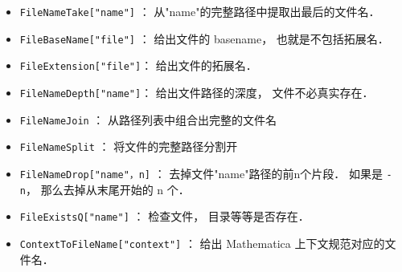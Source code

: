 
\begin{itemize}
\item \verb`FileNameTake["name"]` ： 从"name"的完整路径中提取出最后的文件名．
\item \verb`FileBaseName["file"]` ： 给出文件的 basename， 也就是不包括拓展名．
\item \verb`FileExtension["file"]`： 给出文件的拓展名．
\item \verb`FileNameDepth["name"]`： 给出文件路径的深度， 文件不必真实存在．
\end{itemize}


\begin{itemize}
\item \verb`FileNameJoin` ： 从路径列表中组合出完整的文件名
\item \verb`FileNameSplit` ： 将文件的完整路径分割开
\item \verb`FileNameDrop["name"，n]` ： 去掉文件"name"路径的前n个片段． 如果是 \verb`-n`， 那么去掉从末尾开始的 n 个．
\item \verb`FileExistsQ["name"]`  ： 检查文件， 目录等等是否存在．
\item \verb`ContextToFileName["context"]`  ： 给出 Mathematica 上下文规范对应的文件名．
\end{itemize}


